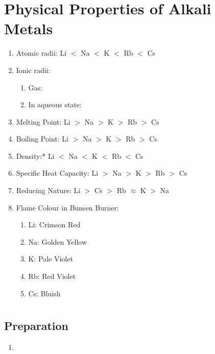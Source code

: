 \documentclass{article}
\begin{document}
\section{Physical Properties of Alkali Metals}

\begin{enumerate}
  \item Atomic radii: Li $<$ Na $<$ K $<$ Rb $<$ Cs
  \item Ionic radii: 
  \begin{enumerate}
    \item Gas: 
    \item In aqueous state: 
  \end{enumerate}
  \item Melting Point: Li $>$ Na $>$ K $>$ Rb $>$ Cs
  \item Boiling Point: Li $>$ Na $>$ K $>$ Rb $>$ Cs
  \item Density:* Li $<$ Na $<$ K $<$ Rb $<$ Cs
  \item Specific Heat Capacity: Li $>$ Na $>$ K $>$ Rb $>$ Cs
  \item Reducing Nature: Li $>$ Cs $>$ Rb $\approx$ K $>$ Na
  \item Flame Colour in Bunsen Burner:
  \begin{enumerate}
    \item Li: Crimson Red
    \item Na: Golden Yellow
    \item K: Pale Violet
    \item Rb: Red Violet
    \item Cs: Bluish
  \end{enumerate}
\end{enumerate}


\section{}

\subsection{Preparation}
\begin{enumerate}
  \item {}
\end{enumerate}
\end{document}
